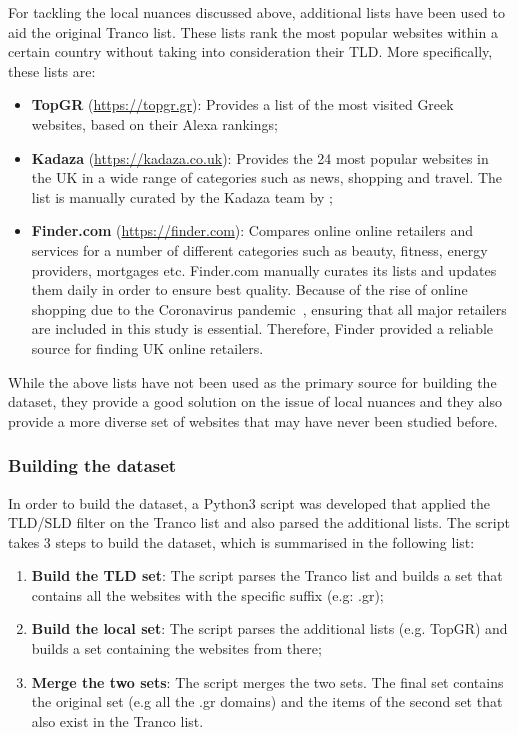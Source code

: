 \documentclass[../main.tex]{subfiles}
\begin{document}
For tackling the local nuances discussed above, additional lists have been used to aid the original Tranco list. These lists rank the most popular websites within a certain country without taking into consideration their TLD. More specifically, these lists are:

\begin{itemize}
    \item \textbf{TopGR} (\url{https://topgr.gr}): Provides a list of the most visited Greek websites, based on their Alexa rankings;

    \item \textbf{Kadaza} (\url{https://kadaza.co.uk}): Provides the 24 most popular websites in the UK in a wide range of categories such as news, shopping and travel. The list is manually curated by the Kadaza team by ;

    \item \textbf{Finder.com} (\url{https://finder.com}): Compares online online retailers and services for a number of different categories such as beauty, fitness, energy providers, mortgages etc. Finder.com manually curates its lists and updates them daily in order to ensure best quality. Because of the rise of online shopping due to the Coronavirus pandemic~\cite{skeldon_2020, columbus_2020}, ensuring that all major retailers are included in this study is essential. Therefore, Finder provided a reliable source for finding UK online retailers. 
\end{itemize}

While the above lists have not been used as the primary source for building the dataset, they provide a good solution on the issue of local nuances and they also provide a more diverse set of websites that may have never been studied before.

\subsubsection{Building the dataset}
In order to build the dataset, a Python3 script was developed that applied the TLD/SLD filter on the Tranco list and also parsed the additional lists. The script takes 3 steps to build the dataset, which is summarised in the following list:

\begin{enumerate}
    \item \textbf{Build the TLD set}: The script parses the Tranco list and builds a set that contains all the websites with the specific suffix (e.g: .gr);

    \item \textbf{Build the local set}: The script parses the additional lists (e.g. TopGR) and builds a set containing the websites from there;

    \item \textbf{Merge the two sets}: The script merges the two sets. The final set contains the original set (e.g all the .gr domains) and the items of the second set that also exist in the Tranco list. 
\end{enumerate}
\end{document}

